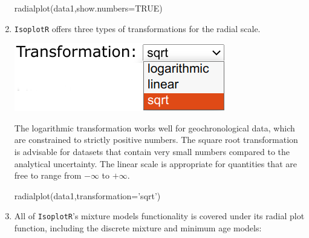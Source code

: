 \begin{refsection}
\begin{enumerate}
\begin{console}
radialplot(data1,show.numbers=TRUE)
\end{console}
  
\item \texttt{IsoplotR} offers three types of transformations for the
  radial scale.
  
\noindent\begin{minipage}[t]{.3\linewidth}
  \strut\vspace*{-\baselineskip}\newline
  \includegraphics[width=\linewidth]{../figures/UPbRadialTransformation.png}
\end{minipage}
\begin{minipage}[t]{.7\linewidth}
The logarithmic transformation works well for geochronological data,
which are constrained to strictly positive numbers. The square root
transformation is advisable for datasets that contain very small
numbers compared to the analytical uncertainty.  The linear scale is
appropriate for quantities that are free to range from $-\infty$ to
$+\infty$.
\end{minipage}

\begin{console}
radialplot(data1,transformation='sqrt')
\end{console}

\item All of \texttt{IsoplotR}'s mixture models functionality is
  covered under its radial plot function, including the discrete
  mixture and minimum age models:


\end{enumerate}
\end{refsection}
